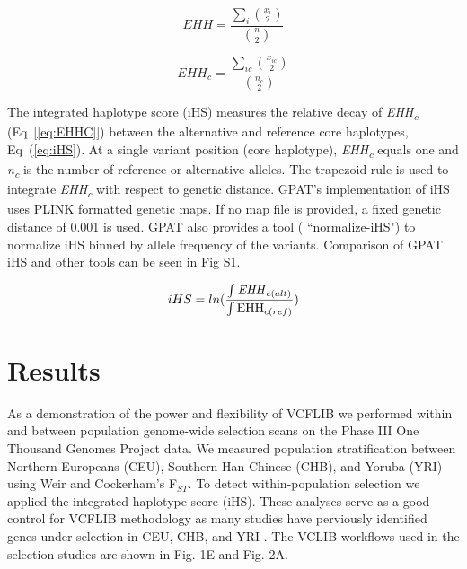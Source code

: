 \documentclass[10pt,letterpaper]{article}
\begin{document}
\begin{equation}\label{eq:EHH} 
EHH=\frac{\sum_{i} \binom{x_i}{2}}{\binom{n}{2}}
\end{equation}

\begin{equation}\label{eq:EHHC} 
EHH_c=\frac{\sum_{ic} \binom{x_{ic}}{2}}{\binom{n_c}{2}}
\end{equation}

The integrated haplotype score (iHS) measures the relative decay of \textit{EHH\textsubscript{c}} (Eq~[\ref{eq:EHHC}]) between the alternative and reference core haplotypes,  Eq~(\ref{eq:iHS})\cite{voight}.  At a single variant position (core haplotype), \textit{EHH\textsubscript{c}} equals one and \textit{n\textsubscript{c}} is the number of reference or alternative alleles.  The trapezoid rule is used to integrate  \textit{EHH\textsubscript{c}} with respect to genetic distance.  GPAT's implementation of iHS uses PLINK formatted genetic maps\cite{plink}.  If no map file is provided, a fixed genetic distance of 0.001 is used.  GPAT also provides a tool ( ``normalize-iHS") to normalize iHS binned by allele frequency of the variants.  Comparison of GPAT iHS and other tools can be seen in Fig S1\cite{selscan}\cite{voight}.

\begin{equation}\label{eq:iHS} 
iHS = ln(\frac{\int \textrm{\textit{EHH}}_{c(alt)}}{ \int \textrm{EHH}_{c(ref)} } )
\end{equation}


\section*{Results}

As a demonstration of the power and flexibility of VCFLIB we performed within and between population genome-wide selection scans on the Phase III One Thousand Genomes Project data\cite{1kg}.  We measured population stratification between Northern Europeans (CEU), Southern Han Chinese (CHB), and Yoruba (YRI) using Weir and Cockerham's  F$_{ST}$. To detect within-population selection we applied the integrated haplotype score (iHS).  These analyses serve as a good control for VCFLIB methodology as many studies have perviously identified genes under selection in CEU, CHB, and YRI \cite{pickrell, sabeti, mathieson, weir}.  The VCLIB workflows used in the selection studies are shown in Fig. 1E and Fig. 2A.
\end{document}
